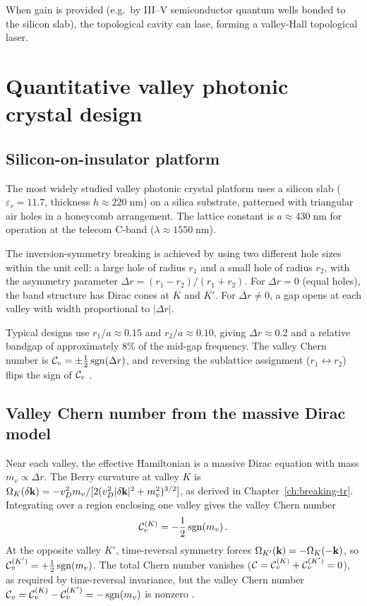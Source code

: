 When gain is provided (e.g.\ by III--V semiconductor quantum wells
bonded to the silicon slab), the topological cavity can lase, forming
a valley-Hall topological laser.

\section{Quantitative valley photonic crystal design}
\label{sec:ch12-quantitative}

\subsection{Silicon-on-insulator platform}
\label{sec:ch12-soi}

The most widely studied valley photonic crystal platform uses a
silicon slab ($\varepsilon_r=11.7$, thickness $h\approx 220\;
\mathrm{nm}$) on a silica substrate, patterned with triangular
air holes in a honeycomb arrangement.  The lattice constant is
$a\approx 430\;\mathrm{nm}$ for operation at the telecom C-band
($\lambda\approx 1550\;\mathrm{nm}$).

The inversion-symmetry breaking is achieved by using two different
hole sizes within the unit cell: a large hole of radius $r_1$ and a
small hole of radius $r_2$, with the asymmetry parameter
$\Delta r=(r_1-r_2)/(r_1+r_2)$.  For $\Delta r=0$ (equal holes),
the band structure has Dirac cones at $K$ and $K'$.  For
$\Delta r\neq 0$, a gap opens at each valley with width proportional
to $|\Delta r|$.

Typical designs use $r_1/a\approx 0.15$ and $r_2/a\approx 0.10$,
giving $\Delta r\approx 0.2$ and a relative bandgap of approximately
$8\%$ of the mid-gap frequency.  The valley Chern number is
$\mathcal{C}_v=\pm\frac{1}{2}\operatorname{sgn}(\Delta r)$, and reversing the sublattice
assignment ($r_1\leftrightarrow r_2$) flips the sign of
$\mathcal{C}_v$ \cite{ma2016all,ozawa2018topological}.

\subsection{Valley Chern number from the massive Dirac model}
\label{sec:ch12-valley-chern-derivation}

Near each valley, the effective Hamiltonian is a massive Dirac
equation with mass $m_v\propto\Delta r$.  The Berry curvature at
valley $K$ is
$\Omega_K(\delta\mathbf{k})
=-v_D^2 m_v/[2(v_D^2|\delta\mathbf{k}|^2+m_v^2)^{3/2}]$,
as derived in Chapter~\ref{ch:breaking-tr}.  Integrating over a region
enclosing one valley gives the valley Chern number
\begin{equation}\label{eq:ch12-valley-chern-formula}
  \mathcal{C}_v^{(K)} = -\frac{1}{2}\operatorname{sgn}(m_v)\,.
\end{equation}
At the opposite valley $K'$, time-reversal symmetry forces
$\Omega_{K'}(\mathbf{k})=-\Omega_K(-\mathbf{k})$, so
$\mathcal{C}_v^{(K')}=+\frac{1}{2}\operatorname{sgn}(m_v)$.  The total Chern number
vanishes ($\mathcal{C}=\mathcal{C}_v^{(K)}+\mathcal{C}_v^{(K')}=0$), as required by
time-reversal invariance, but the valley Chern number
$\mathcal{C}_v=\mathcal{C}_v^{(K)}-\mathcal{C}_v^{(K')}=-\operatorname{sgn}(m_v)$
is nonzero \cite{dong2016valley,gao2017valley}.

